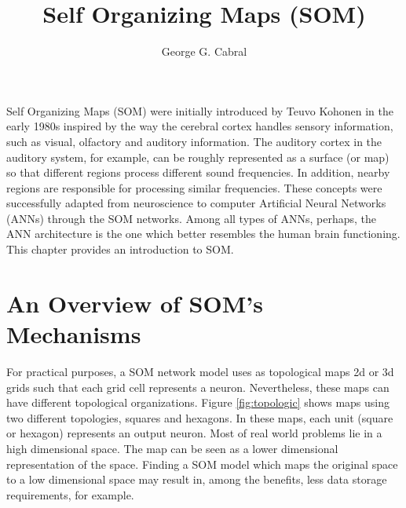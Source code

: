 \title{Self Organizing Maps (SOM)}
\label{chp:self-organizing-maps}
\author{George G. Cabral}
\maketitle




Self Organizing Maps (SOM) were initially introduced by Teuvo Kohonen \cite{kohonen:1982,khonen:1990} in the early 1980s inspired by the way the cerebral cortex handles sensory information, such as visual, olfactory and auditory information. The auditory cortex in the auditory system, for example, can be roughly represented as a surface (or map) so that different regions process different sound frequencies. In addition, nearby regions are responsible for processing similar frequencies. These concepts were successfully adapted from neuroscience to computer Artificial Neural Networks (ANNs) through the SOM networks. Among all types of ANNs, perhaps, the ANN architecture is the one which better resembles the human brain functioning. This chapter provides an introduction to SOM.

\section{An Overview of SOM's Mechanisms}

For practical purposes, a SOM network model uses as topological maps 2d or 3d grids such that each grid cell represents a neuron. Nevertheless, these maps can have different topological organizations. Figure \ref{fig:topologic} shows maps using two different topologies, squares and hexagons. In these maps, each unit (square or hexagon) represents an output neuron. %
 Most of real world problems lie in a high dimensional space. The map can be seen as a lower dimensional representation of the space. Finding a SOM model which maps the original space to a low dimensional space may result in, among the benefits, less data storage requirements, for example.

